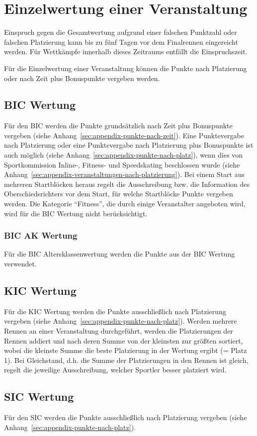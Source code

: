 \section{Einzelwertung einer Veranstaltung}
Einspruch gegen die Gesamtwertung aufgrund einer falschen Punktzahl oder falschen Platzierung kann bis zu fünf Tagen vor dem Finalrennen eingereicht werden. Für Wettkämpfe innerhalb dieses Zeitraums entfällt die Einspruchszeit.

Für die Einzelwertung einer Veranstaltung können die Punkte nach Platzierung oder nach Zeit plus Bonuspunkte vergeben werden.

\subsection{BIC Wertung}
Für den BIC werden die Punkte grundsätzlich nach Zeit plus Bonuspunkte vergeben (siehe Anhang~\ref{sec:appendix-punkte-nach-zeit}). Eine Punktevergabe nach Platzierung oder eine Punktevergabe nach Platzierung plus Bonuspunkte ist auch möglich (siehe Anhang~\ref{sec:appendix-punkte-nach-platz}), wenn dies von Sportkommission Inline-, Fitness- und Speedskating beschlossen wurde (siehe Anhang~\ref{sec:appendix-veranstaltungen-nach-platzierung}). Bei einem Start aus mehreren Startblöcken heraus regelt die Ausschreibung bzw. die Information des Oberschiedsrichters vor dem Start, für welche Startblöcke Punkte vergeben werden. Die Kategorie “Fitness”, die durch einige Veranstalter angeboten wird, wird für die BIC Wertung nicht berücksichtigt.

\subsubsection{BIC AK Wertung}
Für die BIC Altersklassenwertung werden die Punkte aus der BIC Wertung verwendet.

\subsection{KIC Wertung}
Für die KIC Wertung werden die Punkte ausschließlich nach Platzierung vergeben (siehe Anhang~\ref{sec:appendix-punkte-nach-platz}). Werden mehrere Rennen an einer Veranstaltung durchgeführt, werden die Platzierungen der Rennen addiert und nach deren Summe von der kleinsten zur größten sortiert, wobei die kleinste Summe die beste Platzierung in der Wertung ergibt (= Platz 1). Bei Gleichstand, d.h. die Summe der Platzierungen in den Rennen ist gleich, regelt die jeweilige Ausschreibung, welcher Sportler besser platziert wird.

\subsection{SIC Wertung}
Für den SIC werden die Punkte ausschließlich nach Platzierung vergeben (siehe Anhang~\ref{sec:appendix-punkte-nach-platz}).